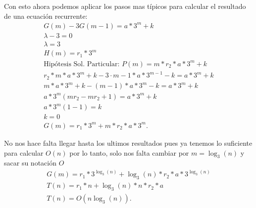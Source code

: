 \documentclass[12pt]{exam}
\begin{document}
Con esto ahora podemos aplicar los pasos mas típicos para calcular el resultado de una ecuación recurrente:
\begin{align*}
  G\left( m \right) - 3G\left( m - 1 \right) = a*3^{m} + k\\
  \lambda - 3 = 0\\
  \lambda = 3\\
  H\left( m \right) = r_1 * 3^{m}\\
  \text{Hipótesis Sol. Particular: } P\left( m \right) = m*r_2*a*3^{m} + k\\
  r_2*m*a*3^{m} + k - 3\cdot m - 1* a * 3^{m - 1} - k = a*3^{m} + k\\
  m*a*3^{m} + k - \left( m - 1 \right) * a* 3^{m} - k = a* 3^{m} + k\\
  a*3^{m}\left( mr_2 - mr_2 + 1 \right) = a* 3^{m} + k\\
  a*3^{m}\left( 1 - 1 \right)  = k\\
  k = 0\\
  G\left( m \right) = r_1*3^{m} + m * r_2 * a * 3^{m}
.\end{align*}

No nos hace falta llegar hasta los ultimos resultados pues ya tenemos lo suficiente para calcular $O\left( n \right) $ por lo tanto, solo nos falta cambiar por $m = \log_3\left( n \right) $ y sacar su notación $O$
\begin{align*}
  G\left( m \right) = r_1*3^{\log_3\left( n \right)} + \log_3\left( n \right) * r_2 * a * 3^{\log_3\left( n \right) }\\
  T\left( n \right)  = r_1*n + \log_3\left( n \right) * n * r_2* a\\
  T\left( n \right) = O\left(   n\log_3\left( n \right) \right)
.\end{align*}
\end{document}
